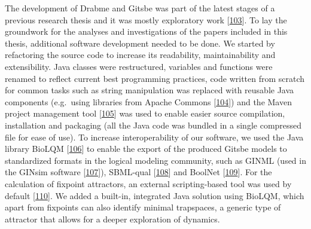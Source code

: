 \documentclass[
  12pt,
]{book}
\begin{document}
The development of Drabme and Gitsbe was part of the latest stages of a previous research thesis and it was mostly exploratory work {[}\protect\hyperlink{ref-Flobak2016}{103}{]}.
To lay the groundwork for the analyses and investigations of the papers included in this thesis, additional software development needed to be done.
We started by refactoring the source code to increase its readability, maintainability and extensibility.
Java classes were restructured, variables and functions were renamed to reflect current best programming practices, code written from scratch for common tasks such as string manipulation was replaced with reusable Java components (e.g.~using libraries from Apache Commons {[}\protect\hyperlink{ref-ApacheCommons}{104}{]}) and the Maven project management tool {[}\protect\hyperlink{ref-Maven}{105}{]} was used to enable easier source compilation, installation and packaging (all the Java code was bundled in a single compressed file for ease of use).
To increase interoperability of our software, we used the Java library BioLQM {[}\protect\hyperlink{ref-Naldi2018}{106}{]} to enable the export of the produced Gitsbe models to standardized formats in the logical modeling community, such as GINML (used in the GINsim software {[}\protect\hyperlink{ref-Naldi2018b}{107}{]}), SBML-qual {[}\protect\hyperlink{ref-Chaouiya2013}{108}{]} and BoolNet {[}\protect\hyperlink{ref-Mussel2010}{109}{]}.
For the calculation of fixpoint attractors, an external scripting-based tool was used by default {[}\protect\hyperlink{ref-Veliz-Cuba2014}{110}{]}.
We added a built-in, integrated Java solution using BioLQM, which apart from fixpoints can also identify minimal trapspaces, a generic type of attractor that allows for a deeper exploration of dynamics.

\newpage
\end{document}
